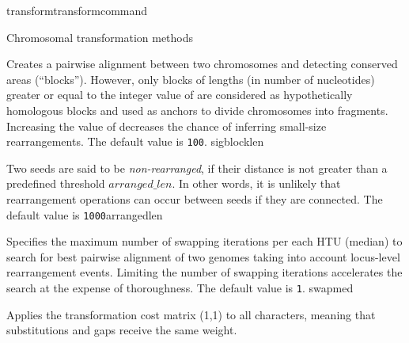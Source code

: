 \begin{command}{transform}{transformcommand}
\begin{arguments}
\begin{argumentgroup}{Chromosomal transformation methods}
\begin{description}
                        {Creates a pairwise alignment between two chromosomes and
                          detecting conserved areas (``blocks''). However, only blocks of
                          lengths (in number of nucleotides) greater or equal to the integer
                          value of  are considered as hypothetically
                        homologous blocks and used as anchors to divide chromosomes into
                        fragments. Increasing the value of  decreases
                        the chance of inferring small-size rearrangements. The default value is \texttt{100}.} 
                        {sigblocklen}

            {Two seeds are said to be \emph{non-rearranged}, 
              if their distance is not greater than  a predefined 
              threshold $arranged\_len$. In other words, it is unlikely that rearrangement 
              operations can occur between seeds if they are connected.
              The default value is \texttt{1000}}{arrangedlen} 



                        {Specifies the maximum number of swapping iterations
                        per each HTU (median) to search for best pairwise
                        alignment of two genomes taking into account locus-level
                        rearrangement events. Limiting the number of swapping
                        iterations accelerates the search at the expense of
                        thoroughness. The default value is \texttt{1}.}
                        {swapmed}

            \end{description}	

	\end{argumentgroup}
	\end{arguments}
	

	\begin{poyexamples} 
            {Applies the transformation cost matrix (1,1) to all characters,
            meaning that substitutions and gaps receive the same weight.}


\end{poyexamples}
\end{command}
